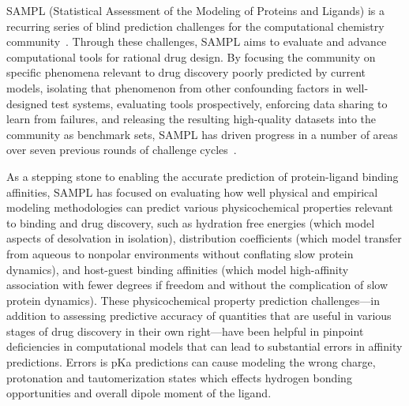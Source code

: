 \documentclass[9pt,lineno]{elife}
\begin{document}
SAMPL (Statistical Assessment of the Modeling of Proteins and Ligands) is a recurring series of blind prediction challenges for the computational chemistry community~\citep{mobley_advancing_2016, sample_D3R_website}. Through these challenges, SAMPL aims to evaluate and advance computational tools for rational drug design. By focusing the community on specific phenomena relevant to drug discovery poorly predicted by current models, isolating that phenomenon from other confounding factors in well-designed test systems, evaluating tools prospectively, enforcing data sharing to learn from failures, and releasing the resulting high-quality datasets into the community as benchmark sets, SAMPL has driven progress in a number of areas over seven previous rounds of challenge cycles~\cite{nicholls_predicting_2008,guthrie_blind_2009,skillman_sampl2_2010,geballe_sampl2_2010,skillman_sampl3_2012,skillman_sampl3_2012,geballe_sampl3_2012,muddana_sampl3_2012,guthrie_sampl4_2014,Mobley:2014:JComputAidedMolDesa,muddana_sampl4_2014,mobley_blind_2014,yin_overview_2016,Bannan:2016:JComputAidedMolDes}.

As a stepping stone to enabling the accurate prediction of protein-ligand binding affinities, SAMPL has focused on evaluating how well physical and empirical modeling methodologies can predict various physicochemical properties relevant to binding and drug discovery, such as hydration free energies (which model aspects of desolvation in isolation), distribution coefficients (which model transfer from aqueous to nonpolar environments without conflating slow protein dynamics), and host-guest binding affinities (which model high-affinity association with fewer degrees if freedom and without the complication of slow protein dynamics).
These physicochemical property prediction challenges---in addition to assessing predictive accuracy of quantities that are useful in various stages of drug discovery in their own right---have been helpful in pinpoint deficiencies in computational models that can lead to substantial errors in affinity predictions. Errors is pKa predictions can cause modeling the wrong charge, protonation and tautomerization states which effects hydrogen bonding opportunities and overall dipole moment of the ligand.
\end{document}
